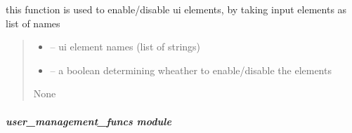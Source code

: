 \documentclass[letterpaper,10pt,english]{sphinxmanual}
\begin{document}
\begin{savenotes}\begin{fulllineitems}
\label{\detokenize{setting/backend/user_login_logout_funcs:oxin.backend.user_login_logout_funcs.set_app_buttons_enable_or_disable}}
\pysigstartsignatures
{}
\pysigstopsignatures
\sphinxAtStartPar
this function is used to enable/disable ui elements, by taking input elements as list of names
\begin{quote}\begin{description}
\begin{itemize}
\item {} 
\sphinxAtStartPar
{} – ui element names (list of strings)

\item {} 
\sphinxAtStartPar
{} – a boolean determining wheather to enable/disable the elements

\end{itemize}

\sphinxAtStartPar
None

\end{description}\end{quote}

\end{fulllineitems}\end{savenotes}


\sphinxstepscope


\subparagraph{user\_management\_funcs module}
\label{\detokenize{setting/backend/user_management_funcs:module-oxin.backend.user_management_funcs}}\label{\detokenize{setting/backend/user_management_funcs:user-management-funcs-module}}\label{\detokenize{setting/backend/user_management_funcs::doc}}
\end{document}
